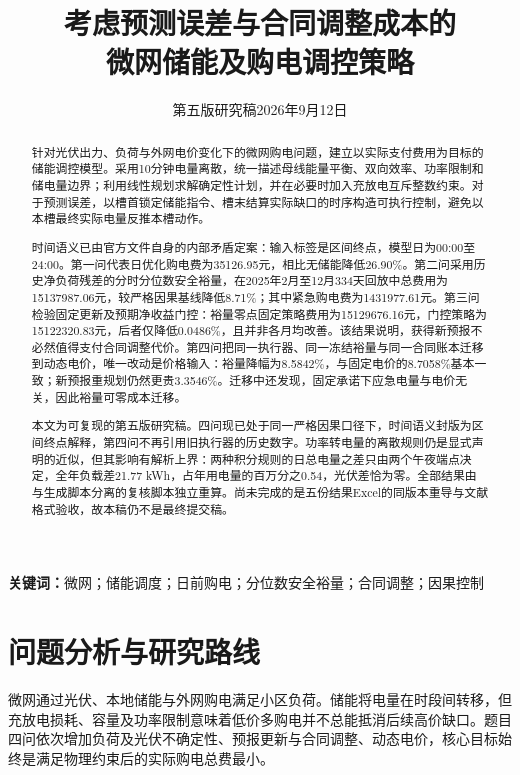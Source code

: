 \documentclass[UTF8,a4paper,zihao=-4,fontset=fandol]{ctexart}
\title{考虑预测误差与合同调整成本的\\微网储能及购电调控策略}
\author{}\date{第五版研究稿\quad 2026年9月12日}
\begin{document}
\maketitle\vspace{-2em}
\begin{abstract}
针对光伏出力、负荷与外网电价变化下的微网购电问题，建立以实际支付费用为目标的储能调控模型。采用10分钟电量离散，统一描述母线能量平衡、双向效率、功率限制和储电量边界；利用线性规划求解确定性计划，并在必要时加入充放电互斥整数约束。对于预测误差，以槽首锁定储能指令、槽末结算实际缺口的时序构造可执行控制，避免以本槽最终实际电量反推本槽动作。

时间语义已由官方文件自身的内部矛盾定案：输入标签是区间终点，模型日为00:00至24:00。第一问代表日优化购电费为35126.95元，相比无储能降低26.90\%。第二问采用历史净负荷残差的分时分位数安全裕量，在2025年2月至12月334天回放中总费用为15137987.06元，较严格因果基线降低8.71\%；其中紧急购电费为1431977.61元。第三问检验固定更新及预期净收益门控：裕量零点固定策略费用为15129676.16元，门控策略为15122320.83元，后者仅降低0.0486\%，且并非各月均改善。该结果说明，获得新预报不必然值得支付合同调整代价。第四问把同一执行器、同一冻结裕量与同一合同账本迁移到动态电价，唯一改动是价格输入：裕量降幅为8.5842\%，与固定电价的8.7058\%基本一致；新预报重规划仍然更贵3.3546\%。迁移中还发现，固定承诺下应急电量与电价无关，因此裕量可零成本迁移。

本文为可复现的第五版研究稿。四问现已处于同一严格因果口径下，时间语义封版为区间终点解释，第四问不再引用旧执行器的历史数字。功率转电量的离散规则仍是显式声明的近似，但其影响有解析上界：两种积分规则的日总电量之差只由两个午夜端点决定，全年负载差21.77 kWh，占年用电量的百万分之0.54，光伏差恰为零。全部结果由与生成脚本分离的复核脚本独立重算。尚未完成的是五份结果Excel的同版本重导与文献格式验收，故本稿仍不是最终提交稿。
\end{abstract}
\noindent\textbf{关键词：}微网；储能调度；日前购电；分位数安全裕量；合同调整；因果控制
\newpage
\section{问题分析与研究路线}
微网通过光伏、本地储能与外网购电满足小区负荷。储能将电量在时段间转移，但充放电损耗、容量及功率限制意味着低价多购电并不总能抵消后续高价缺口。题目四问依次增加负荷及光伏不确定性、预报更新与合同调整、动态电价，核心目标始终是满足物理约束后的实际购电总费最小\cite{problem}。
\end{document}
